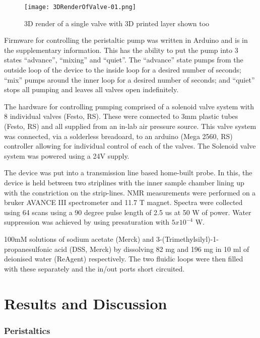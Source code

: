\begin{figure}
  \begin{center}
  \texttt{[image: 3DRenderOfValve-01.png]}
  \caption{3D render of a single valve with 3D printed layer shown too}
  \label{fig:ValveRend}
  \end{center}
\end{figure}

Firmware for controlling the peristaltic pump was written in Arduino and is in the
supplementary information. This has the ability to put the pump into 3 states
“advance”, “mixing” and “quiet”. The “advance” state pumps from the outside loop of
the device to the inside loop for a desired number of seconds; “mix” pumps around the
inner loop for a desired number of seconds; and “quiet” stops all pumping and leaves
all valves open indefinitely.

The hardware for controlling pumping comprised of a solenoid valve system with 8
individual valves (Festo, RS). These were connected to 3mm plastic tubes (Festo, RS)
and all supplied from an in-lab air pressure source. This valve system was connected,
via a solderless breadoard, to an arduino (Mega 2560, RS) controller allowing for
individual control of each of the valves. The Solenoid valve system was powered using
a 24V supply.

The device was put into a transmission line based home-built probe. In this, the
device is held between two striplines with the inner sample chamber lining up with the
constriction on the strip-lines. NMR measurements were performed on a bruker AVANCE
III spectrometer and 11.7 T magnet. Spectra were collected using 64 scans using a 90
degree pulse length of 2.5 us at 50 W of power. Water suppression was achieved by
using presaturation with $5x10^{-4}$ W.

100mM solutions of sodium acetate (Merck) and 3-(Trimethylsilyl)-1-propanesulfonic
acid (DSS, Merck) by dissolving 82 mg and 196 mg in 10 ml of deionised water
(ReAgent)
respectively. The two fluidic loops were then filled with these separately and the
in/out ports short circuited.

\section{Results and Discussion}

\subsubsection{Peristaltics}


